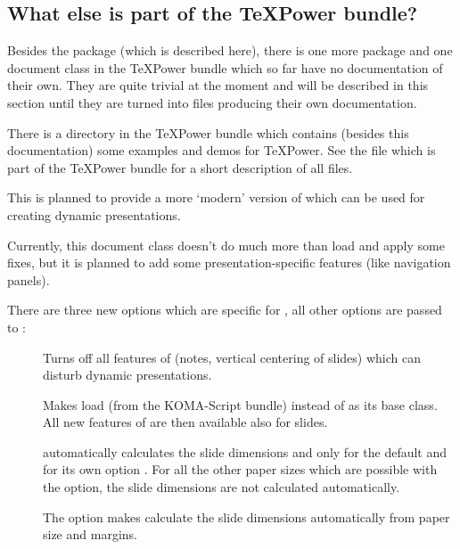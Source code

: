 \subsection{What else is part of the \TeX Power bundle?}
Besides the package  (which is described here), there is one more package and one document class in the
\TeX Power bundle which so far have no documentation of their own. They are quite trivial at the moment and will be
described in this section until they are turned into  files producing their own documentation.

There is a  directory in the \TeX Power bundle which contains (besides this documentation) some examples and
demos for \TeX Power. See the file  which is part of the \TeX Power bundle for a short description of
all files.

This is planned to provide a more `modern' version of  which can be used for creating dynamic
presentations. 

Currently, this document class doesn't do much more than load  and apply some fixes, but it is planned to
add some presentation-specific features (like navigation panels).

\newslide

There are three new options which are specific for , all other options are passed to :
\begin{description}
\item[] Turns off all features of  (notes, vertical centering of slides)
  which can disturb dynamic presentations.
  
\item[] Makes  load  (from the KOMA-Script bundle) instead of
   as its base class. All new features of  are then available also for slides.
  
\newslide

\item[]  automatically calculates the slide dimensions
   and  only for the default  and for its own option
  . For all the other paper sizes which are possible with the  option, the slide dimensions are not
  calculated automatically. 
  
  The  option makes  calculate the slide dimensions automatically from paper size
  and margins.
\end{description}

